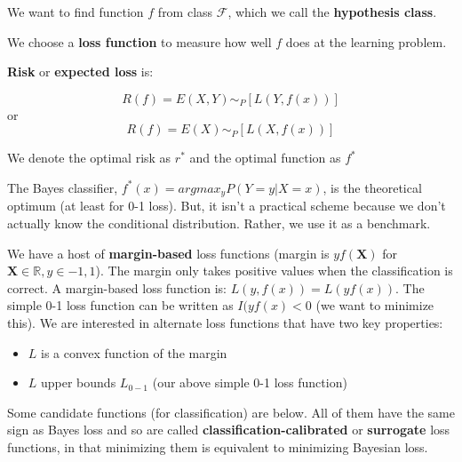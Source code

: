 \documentclass{article}
\begin{document}
We want to find function $f$ from class $\mathcal{F}$, which we call the
\textbf{hypothesis class}.

\smallskip

We choose a \textbf{loss function} to measure how well $f$ does at the learning
problem.

\smallskip

\textbf{Risk} or \textbf{expected loss} is:

$$
R(f) = E(X,Y) \sim_P[L(Y, f(x))]
$$
or
$$
R(f) = E(X) \sim_P[L(X, f(x))]
$$

\smallskip

We denote the optimal risk as $r^*$ and the optimal function as $f^*$

\smallskip

The Bayes classifier, $f^*(x) = argmax_y P(Y=y|X=x)$, is the theoretical optimum
(at least for 0-1 loss). But, it isn't a practical scheme because we don't
actually know the conditional distribution. Rather, we use it as a benchmark.

\smallskip

We have a host of \textbf{margin-based} loss functions (margin is
$yf(\mathbf{X})$ for $\mathbf{X} \in \mathbb{R}, y \in {-1,1}$). The margin only
takes positive values when the classification is correct. A margin-based
loss function is: $L(y, f(x)) = L(yf(x))$. The simple 0-1 loss function can be
written as $I(yf(x) < 0$ (we want to minimize this). We are interested in
alternate loss functions that have two key properties:
\begin{itemize}
	\item $L$ is a convex function of the margin
	\item $L$ upper bounds $L_{0-1}$ (our above simple 0-1 loss function)
\end{itemize}

\smallskip

Some candidate functions (for classification) are below. All of them have the
same sign as Bayes loss and so are called \textbf{classification-calibrated} or
\textbf{surrogate} loss functions, in that minimizing them is equivalent to
minimizing Bayesian loss.
\end{document}

